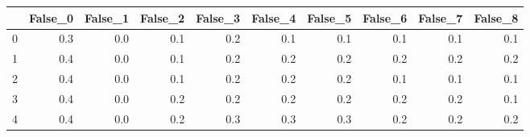 \begin{tabular}{lrrrrrrrrr}
\toprule
{} &  False\_0 &  False\_1 &  False\_2 &  False\_3 &  False\_4 &  False\_5 &  False\_6 &  False\_7 &  False\_8 \\ \hline
\midrule
0 &      0.3 &      0.0 &      0.1 &      0.2 &      0.1 &      0.1 &      0.1 &      0.1 &      0.1 \\ \hline
1 &      0.4 &      0.0 &      0.1 &      0.2 &      0.2 &      0.2 &      0.2 &      0.2 &      0.2 \\ \hline
2 &      0.4 &      0.0 &      0.1 &      0.2 &      0.2 &      0.2 &      0.1 &      0.1 &      0.1 \\ \hline
3 &      0.4 &      0.0 &      0.2 &      0.2 &      0.2 &      0.2 &      0.2 &      0.2 &      0.1 \\ \hline
4 &      0.4 &      0.0 &      0.2 &      0.3 &      0.3 &      0.3 &      0.2 &      0.2 &      0.2 \\ \hline
\bottomrule
\end{tabular}
